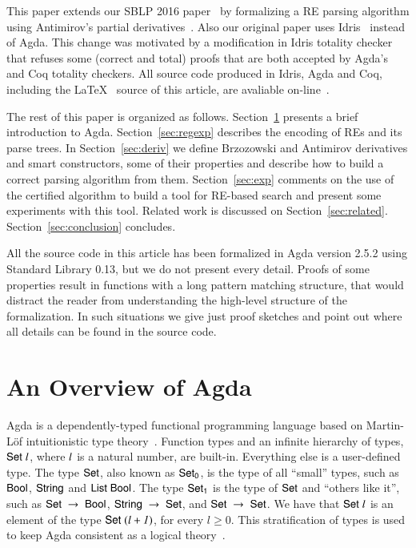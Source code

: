 \documentclass[review]{elsarticle}
\theoremstyle{definition}
\newcommand{\D}[1]{\blue{\mathsf{#1}}}
\newcommand{\V}[1]{\purple{\mathit{#1}}}
\begin{document}
This paper extends our SBLP 2016 paper~\cite{Lopes2016} by formalizing
a RE parsing algorithm using Antimirov's partial
derivatives~\cite{Antimirov1996}.  Also our original paper uses
Idris~\cite{Brady2013} instead of Agda. This change was motivated by a
modification in Idris totality checker that refuses some (correct and
total) proofs that are both accepted by Agda's and Coq totality
checkers. All source code produced in Idris, Agda and Coq, including
the \LaTeX~ source of this article, are avaliable
on-line~\cite{regex-rep}.

The rest of this paper is organized as follows. Section~\ref{sec:agda}
presents a brief introduction to Agda. Section~\ref{sec:regexp}
describes the encoding of REs and its parse trees. In
Section~\ref{sec:deriv} we define Brzozowski and Antimirov derivatives
and smart constructors, some of their properties and describe how to
build a correct parsing algorithm from them. Section~\ref{sec:exp}
comments on the use of the certified algorithm to build a tool for
RE-based search and present some experiments with this tool. Related
work is discussed on
Section~\ref{sec:related}. Section~\ref{sec:conclusion} concludes.

All the source code in this article has been formalized in Agda
version 2.5.2 using Standard Library 0.13, but
we do not present every detail. Proofs of some properties result in
functions with a long pattern matching structure, that would distract
the reader from understanding the high-level structure of the
formalization. In such situations we give just proof sketches and point
out where all details can be found in the source code.

\section{An Overview of Agda}\label{sec:agda}


Agda is a dependently-typed functional programming language based on
Martin-L\"of intuitionistic type theory~\cite{Lof98}.  Function types
and an infinite hierarchy of types, \ensuremath{\D{Set}\;\V{l}}, where \ensuremath{\V{l}} is a
natural number, are built-in. Everything else is a user-defined
type. The type \ensuremath{\D{Set}}, also known as \ensuremath{\D{Set}_{\D{0}}}, is the type of all
``small'' types, such as \ensuremath{\D{Bool}}, \ensuremath{\D{String}} and \ensuremath{\D{List}\;\D{Bool}}.  The type
\ensuremath{\D{Set}_{\D{1}}} is the type of \ensuremath{\D{Set}} and ``others like it'', such as \ensuremath{\D{Set}\;\to \;\D{Bool}}, \ensuremath{\D{String}\;\to \;\D{Set}}, and \ensuremath{\D{Set}\;\to \;\D{Set}}. We have that \ensuremath{\D{Set}\;\V{l}} is an
element of the type \ensuremath{\D{Set}\;(\V{l+1})}, for every $l≥0$. This
stratification of types is used to keep Agda consistent as a logical
theory~\cite{Sorensen2006}.
\end{document}
